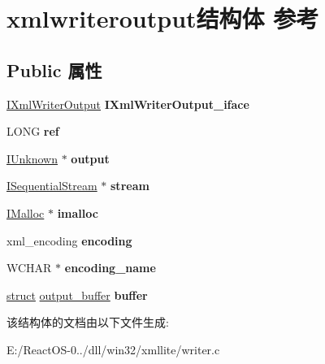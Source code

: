 \hypertarget{structxmlwriteroutput}{}\section{xmlwriteroutput结构体 参考}
\label{structxmlwriteroutput}
\subsection*{Public 属性}
\begin{DoxyCompactItemize}
\item 
\mbox{\label{structxmlwriteroutput_a25b206286d3b2b90291ae0bcd5173033}} 
\hyperlink{interface_i_unknown}{I\+Xml\+Writer\+Output} {\bfseries I\+Xml\+Writer\+Output\+\_\+iface}
\item 
\mbox{\label{structxmlwriteroutput_a1e6222777912d384d7b2a1df0c35c106}} 
L\+O\+NG {\bfseries ref}
\item 
\mbox{\label{structxmlwriteroutput_a799292b5b0f2bd511522724e4cdc5a90}} 
\hyperlink{interface_i_unknown}{I\+Unknown} $\ast$ {\bfseries output}
\item 
\mbox{\label{structxmlwriteroutput_aa0038be0b95d504d87ff1b1471511e9e}} 
\hyperlink{interface_i_sequential_stream}{I\+Sequential\+Stream} $\ast$ {\bfseries stream}
\item 
\mbox{\label{structxmlwriteroutput_afe342b0212470ecddba8f81b63199a65}} 
\hyperlink{interface_i_malloc}{I\+Malloc} $\ast$ {\bfseries imalloc}
\item 
\mbox{\label{structxmlwriteroutput_ae9ca89e81508e98e5295cc6115052acd}} 
xml\+\_\+encoding {\bfseries encoding}
\item 
\mbox{\label{structxmlwriteroutput_acce700bb1ef989d4142434fcc3d7b75b}} 
W\+C\+H\+AR $\ast$ {\bfseries encoding\+\_\+name}
\item 
\mbox{\label{structxmlwriteroutput_a4aec0b1a5e7478e4cb62aac1a81e7521}} 
\hyperlink{interfacestruct}{struct} \hyperlink{structoutput__buffer}{output\+\_\+buffer} {\bfseries buffer}
\end{DoxyCompactItemize}


该结构体的文档由以下文件生成\+:\begin{DoxyCompactItemize}
\item 
E\+:/\+React\+O\+S-\/0../dll/win32/xmllite/writer.\+c\end{DoxyCompactItemize}
